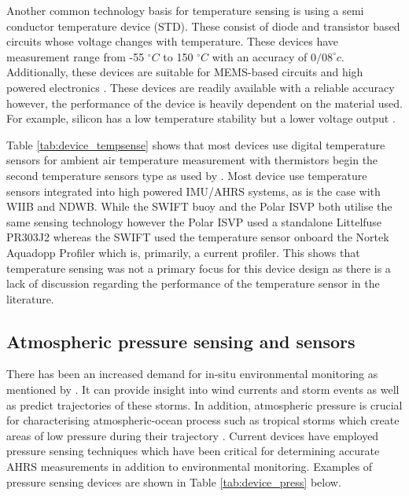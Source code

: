 Another common technology basis for temperature sensing is using a semi conductor temperature device (STD). These consist of diode and transistor based circuits whose voltage changes with temperature. These devices have measurement range from -55 $^\circ C$  to 150 $^\circ C$ with an accuracy of $0/08 ^\circ c$. Additionally, these devices are suitable for MEMS-based circuits and high powered electronics \cite{willander2006silicon}. These devices are readily available with a reliable accuracy however, the performance of the device is heavily dependent on the material used. For example, silicon has a low temperature stability but a lower voltage output \cite{childs2000review}.

Table \ref{tab:device_tempsense} shows that most devices use digital temperature sensors for ambient air temperature measurement with thermistors begin the second temperature sensors type as used by \textcite{thomson2012wave}. Most device use temperature sensors integrated into high powered IMU/AHRS systems, as is the case with WIIB and NDWB. While the SWIFT buoy and the Polar ISVP both utilise the same sensing technology however the Polar ISVP used a standalone Littelfuse PR303J2 whereas the SWIFT used the temperature sensor onboard the Nortek Aquadopp Profiler which is, primarily, a current profiler. This shows that temperature sensing was not a primary focus for this device design as there is a lack of discussion regarding the performance of the temperature sensor in the literature.


\subsection{Atmospheric pressure sensing and sensors}

There has been an increased demand for in-situ environmental monitoring as mentioned by \cite{vichi2019effects,kennicutt2014polar,kennicutt2016delivering,kennicutt2019sustained,alberello2019drift}. It can provide insight into wind currents and storm events as well as predict trajectories of these storms. In addition, atmospheric pressure is crucial for characterising atmospheric-ocean process such as tropical storms which create areas of low pressure during their trajectory \cite{vichi2019effects}. Current devices have employed pressure sensing techniques which have been critical for determining accurate AHRS measurements \cite{vn-100} in addition to environmental monitoring. Examples of pressure sensing devices are shown in Table \ref{tab:device_press} below.

